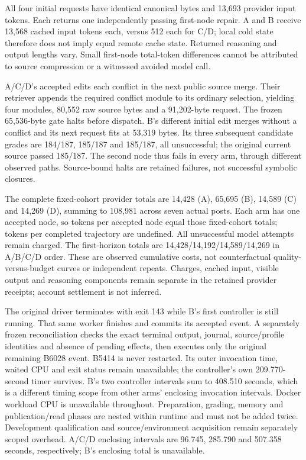 All four initial requests have identical canonical bytes and 13,693 provider
input tokens. Each returns one independently passing first-node repair. A and
B receive 13,568 cached input tokens each, versus 512 each for C/D; local cold
state therefore does not imply equal remote cache state. Returned reasoning
and output lengths vary. Small first-node total-token differences cannot be
attributed to source compression or a witnessed avoided model call.

A/C/D's accepted edits each conflict in the next public source merge.
Their retriever appends the required conflict module to its ordinary selection,
yielding four modules, 80,552 raw source bytes and a 91,202-byte request. The
frozen 65,536-byte gate halts before dispatch. B's different initial edit
merges without a conflict and its next request fits at 53,319 bytes. Its
three subsequent candidate grades are 184/187, 185/187 and 185/187, all
unsuccessful; the original current source passed 185/187. The second node
thus fails in every arm, through different observed paths. Source-bound
halts are retained failures, not successful symbolic closures.

The complete fixed-cohort provider totals are 14,428 (A), 65,695 (B),
14,589 (C) and 14,269 (D), summing to 108,981 across seven actual posts.
Each arm has one accepted node, so tokens per accepted node equal those
fixed-cohort totals; tokens per completed trajectory are undefined. All
unsuccessful model attempts remain charged. The first-horizon totals are
14,428/14,192/14,589/14,269 in A/B/C/D order. These are observed cumulative
costs, not counterfactual quality-versus-budget curves or independent repeats.
Charges, cached input, visible output and reasoning components remain separate
in the retained provider receipts; account settlement is not inferred.

The original driver terminates with exit 143 while B's first controller is
still running. That same worker finishes and commits its accepted event.
A separately frozen reconciliation checks the exact terminal output, journal,
source/profile identities and absence of pending effects, then executes only
the original remaining B6028 event. B5414 is never restarted. Its outer
invocation time, waited CPU and exit status remain unavailable; the controller's
own 209.770-second timer survives. B's two controller intervals sum to
408.510 seconds, which is a different timing scope from other arms' enclosing
invocation intervals. Docker workload CPU is unavailable throughout. Preparation,
grading, memory and publication/read phases are nested within runtime and must
not be added twice. Development qualification and source/environment acquisition
remain separately scoped overhead. A/C/D enclosing intervals are 96.745,
285.790 and 507.358 seconds, respectively; B's enclosing total is unavailable.

